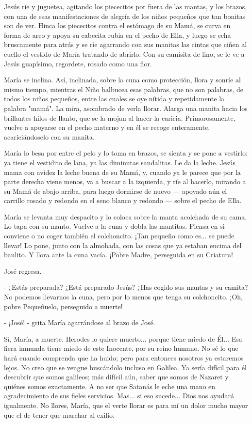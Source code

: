 \documentclass[12pt]{book} %
\begin{document}
Jesús ríe y juguetea, agitando los piececitos por fuera de las mantas, y los brazos, con una de esas manifestaciones de alegría de los niños pequeños que tan bonitas son de ver. Hinca los piececitos contra el estómago de su Mamá, se curva en forma de arco y apoya su cabecita rubia en el pecho de Ella, y luego se echa bruscamente para atrás y se ríe agarrando con sus manitas las cintas que ciñen al cuello el vestido de María tratando de abrirlo. Con su camisita de lino, se le ve a Jesús guapísimo, regordete, rosado como una flor. 

María se inclina. Así, inclinada, sobre la cuna como protección, llora y sonríe al mismo tiempo, mientras el Niño balbucea esas palabras, que no son palabras, de todos los niños pequeños, entre las cuales se oye nítida y repetidamente la palabra "mamá". La mira, asombrado de verla llorar. Alarga una manita hacia los brillantes hilos de llanto, que se la mojan al hacer la caricia. Primorosamente, vuelve a apoyarse en el pecho materno y en él se recoge enteramente, acariciándoselo con su manita. 

María lo besa por entre el pelo y lo toma en brazos, se sienta y se pone a vestirlo: ya tiene el vestidito de lana, ya las diminutas sandalitas. Le da la leche. Jesús mama con avidez la leche buena de su Mamá, y, cuando ya le parece que por la parte derecha viene menos, va a buscar a la izquierda, y ríe al hacerlo, mirando a su Mamá de abajo arriba, para luego dormirse de nuevo — apoyado aún el carrillo rosado y redondo en el seno blanco y redondo — sobre el pecho de Ella. 

María se levanta muy despacito y lo coloca sobre la manta acolchada de su cama. Lo tapa con su manto. Vuelve a la cuna y dobla las mantitas. Piensa en si conviene o no coger también el colchoncito. ¡Tan pequeño como es... se puede llevar! Lo pone, junto con la almohada, con las cosas que ya estaban encima del baulito. Y llora ante la cuna vacía. ¡Pobre Madre, perseguida en su Criatura! 

José regresa. 

- ¿Estás preparada? ¿Está preparado Jesús? ¿Has cogido sus mantas y su camita? No podemos llevarnos la cuna, pero por lo menos que tenga su colchoncito. ¡Oh, pobre Pequeñuelo, perseguido a muerte! 

- ¡José! - grita María agarrándose al brazo de José. 

Sí, María, a muerte. Herodes lo quiere muerto... porque tiene miedo de Él... Esa fiera inmunda tiene miedo de este Inocente, por su reino humano. No sé lo que hará cuando comprenda que ha huido; pero para entonces nosotros ya estaremos lejos. No creo que se vengue buscándolo incluso en Galilea. Ya sería difícil para él descubrir que somos galileos; más difícil aún, saber que somos de Nazaret y quiénes somos exactamente. A no ser que Satanás le eche una mano en agradecimiento de sus fieles servicios. Mas... si eso sucede... Dios nos ayudará igualmente. No llores, María, que el verte llorar es para mí un dolor mucho mayor que el de tener que marchar al exilio. 
\end{document}
